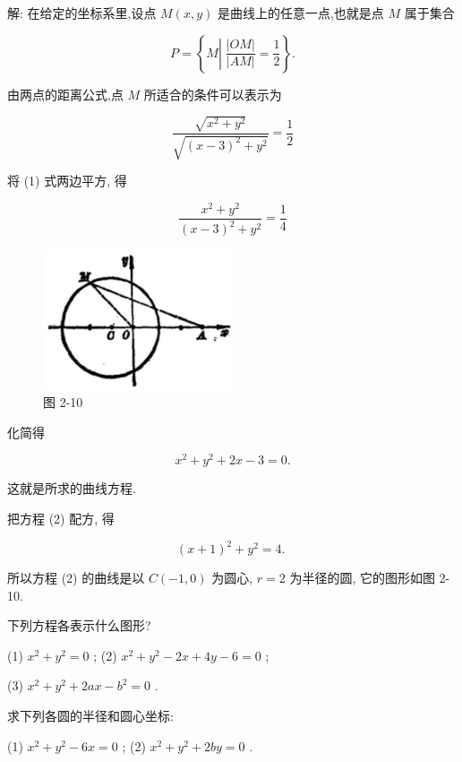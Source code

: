 \documentclass[lang=cn,newtx,10.5pt,scheme=chinese]{elegantbook}
\begin{document}
解: 在给定的坐标系里,设点 \(M\left( {x,y}\right)\) 是曲线上的任意一点,也就是点 \(M\) 属于集合

\[
  P = \left\{ {M\left| {\;\frac{\left| OM\right| }{\left| AM\right| } = \frac{1}{2}}\right. }\right\} .
\]

由两点的距离公式,点 \(M\) 所适合的条件可以表示为

\[
  \frac{\sqrt{{x}^{2} + {y}^{2}}}{\sqrt{{\left( x - 3\right) }^{2} + {y}^{2}}} = \frac{1}{2} \tag{1}
\]

将 (1) 式两边平方, 得

\[
  \frac{{x}^{2} + {y}^{2}}{{\left( x - 3\right) }^{2} + {y}^{2}} = \frac{1}{4}
\]

\begin{figure}[h]
  \centering
  \includegraphics[max width=0.5\textwidth]{images/01912cc2-ffb6-728e-9ae7-b113ff05c64b_84_125563.jpg}
  \caption{图 2-10}
\end{figure}



化简得

\[
    {x}^{2} + {y}^{2} + {2x} - 3 = 0. \tag{2}
\]

这就是所求的曲线方程.

把方程 (2) 配方, 得

\[
    {\left( x + 1\right) }^{2} + {y}^{2} = 4\text{. }
\]

所以方程 (2) 的曲线是以 \(C\left( {-1,0}\right)\) 为圆心, \(r = 2\) 为半径的圆, 它的图形如图 2-10.

\begin{problemset}[练习]

\item 下列方程各表示什么图形?

(1) \({x}^{2} + {y}^{2} = 0\) ; (2) \({x}^{2} + {y}^{2} - {2x} + {4y} - 6 = 0\) ;

(3) \({x}^{2} + {y}^{2} + {2ax} - {b}^{2} = 0\) .

\item 求下列各圆的半径和圆心坐标:

(1) \({x}^{2} + {y}^{2} - {6x} = 0\) ; (2) \({x}^{2} + {y}^{2} + {2by} = 0\) .
\end{problemset}
\end{document}
